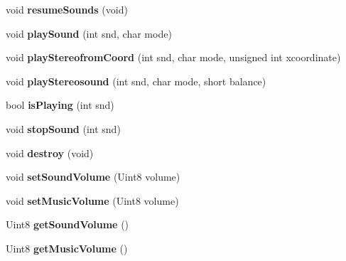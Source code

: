 \begin{DoxyCompactItemize}
\item 
\hypertarget{class_c_sound_a6c10211cf8e32c9179bfb0653e734a71}{
void {\bfseries resumeSounds} (void)}
\label{class_c_sound_a6c10211cf8e32c9179bfb0653e734a71}

\item 
\hypertarget{class_c_sound_af503bfebf0c38222d4835a9c83573974}{
void {\bfseries playSound} (int snd, char mode)}
\label{class_c_sound_af503bfebf0c38222d4835a9c83573974}

\item 
\hypertarget{class_c_sound_aca16209f8b3990b5223fe6333964b4d4}{
void {\bfseries playStereofromCoord} (int snd, char mode, unsigned int xcoordinate)}
\label{class_c_sound_aca16209f8b3990b5223fe6333964b4d4}

\item 
\hypertarget{class_c_sound_a4ffc21001359c3c172338c55c27fed86}{
void {\bfseries playStereosound} (int snd, char mode, short balance)}
\label{class_c_sound_a4ffc21001359c3c172338c55c27fed86}

\item 
\hypertarget{class_c_sound_a01eb39ae630a6f028e3e0d17451bf4ef}{
bool {\bfseries isPlaying} (int snd)}
\label{class_c_sound_a01eb39ae630a6f028e3e0d17451bf4ef}

\item 
\hypertarget{class_c_sound_acf15160e04abc57b144a46c575cac5c9}{
void {\bfseries stopSound} (int snd)}
\label{class_c_sound_acf15160e04abc57b144a46c575cac5c9}

\item 
\hypertarget{class_c_sound_a1bb1bd9d8a44722a059c45931dd0a5b4}{
void {\bfseries destroy} (void)}
\label{class_c_sound_a1bb1bd9d8a44722a059c45931dd0a5b4}

\item 
\hypertarget{class_c_sound_ad636cc881553ca84f0f87499567238eb}{
void {\bfseries setSoundVolume} (Uint8 volume)}
\label{class_c_sound_ad636cc881553ca84f0f87499567238eb}

\item 
\hypertarget{class_c_sound_a79cbe0e6ec849422eba616d728874ef9}{
void {\bfseries setMusicVolume} (Uint8 volume)}
\label{class_c_sound_a79cbe0e6ec849422eba616d728874ef9}

\item 
\hypertarget{class_c_sound_ae699d7e2246c2068994cb439a67897f3}{
Uint8 {\bfseries getSoundVolume} ()}
\label{class_c_sound_ae699d7e2246c2068994cb439a67897f3}

\item 
\hypertarget{class_c_sound_afbe5979570cd9dc894d106d65854a991}{
Uint8 {\bfseries getMusicVolume} ()}
\label{class_c_sound_afbe5979570cd9dc894d106d65854a991}


\end{DoxyCompactItemize}
